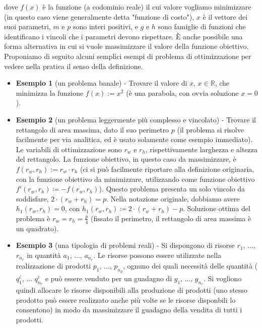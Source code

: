 \documentclass[12pt]{article}
\begin{document}
dove $f(x)$ è la funzione (a codominio reale) il cui valore vogliamo minimizzare (in questo caso viene generalmente detta "funzione di costo"), $x$ è il vettore dei suoi parametri, $m$ e $p$ sono interi positivi, e $g$ e $h$ sono famiglie di funzioni che identificano i vincoli che i parametri devono rispettare.
È anche possibile una forma alternativa in cui si vuole massimizzare il valore della funzione obiettivo.\newline
\newline
Proponiamo di seguito alcuni semplici esempi di problema di ottimizzazione per vedere nella pratica il senso della definizione.
\begin{itemize}
\item \textbf{Esempio 1} (un problema banale) - Trovare il valore di $x$, $x\in \mathbb{R}$, che minimizza la funzione $f(x) := x^2$ (è una parabola, con ovvia soluzione $x = 0$).

\item \textbf{Esempio 2} (un problema leggermente più complesso e vincolato) - Trovare il rettangolo di area massima, dato il suo perimetro $p$ (il problema si risolve facilmente per via analitica, ed è usato solamente come esempio immediato). Le variabili di ottimizzazione sono $r_w$ e $r_h$, rispettivamente larghezza e altezza del rettangolo. La funzione obiettivo, in questo caso da massimizzare, è $f(r_w, r_h) := r_w \cdot r_h$ (ci si può facilmente riportare alla definizione originaria, con la funzione obiettivo da minimizzare, utilizzando come funzione obiettivo $f'(r_w, r_h) \coloneqq -f(r_w, r_h)$). Questo problema presenta un solo vincolo da soddisfare, $2 \cdot (r_w+r_h) = p$. Nella notazione originale, dobbiamo avere $h_1(r_w, r_h) = 0$, con $h_1(r_w, r_h) \coloneqq 2 \cdot (r_w+r_h)-p$. Soluzione ottima del problema è $r_w = r_h = \frac{p}{4}$ (fissato il perimetro, il rettangolo di area massima è un quadrato).

\item \textbf{Esempio 3} (una tipologia di problemi reali) - Si dispongono di risorse $r_1$, ..., $r_{n_r}$ in quantità $a_1$, ..., $a_{n_r}$. Le risorse possono essere utilizzate nella realizzazione di prodotti $p_1$, ..., $p_{n_p}$, ognuno dei quali necessità delle quantità ( $q^i_{1}$, ... $q^i_{n_r}$ e può essere venduto per un guadagno di $g_1$, ..., $g_{n_r}$. Si vogliono quindi allocare le risorse disponibili alla produzione di prodotti (uno stesso prodotto può essere realizzato anche più volte se le risorse disponbili lo consentono) in modo da massimizzare il guadagno della vendita di tutti i prodotti.

\end{itemize}
\end{document}
